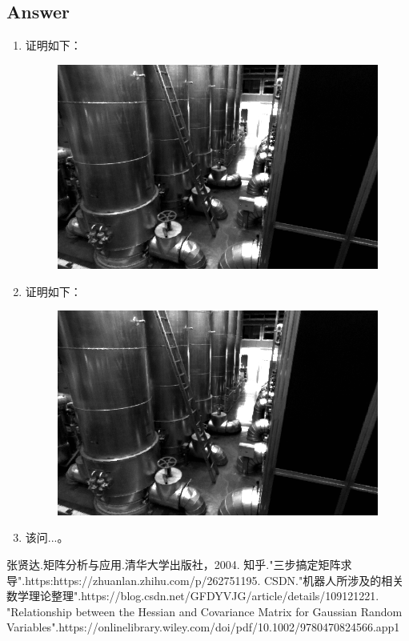 \documentclass[
	12pt, %
]{fphw} %
\begin{document}

\subsection*{Answer}

\begin{enumerate}
	\item 证明如下：
	\begin{figure}[H]
		\centering
		\includegraphics[width=1.0\columnwidth]{pic1.png} 
	\end{figure}
	\item 证明如下：
	\begin{figure}[H]
		\centering
		\includegraphics[width=1.0\columnwidth]{pic1.png} 
	\end{figure}
	\item 该问...。
\end{enumerate}


%
\begin{thebibliography}{99}    %
	张贤达.矩阵分析与应用.清华大学出版社，2004.                    %
	知乎."三步搞定矩阵求导".https:https://zhuanlan.zhihu.com/p/262751195.         %
	CSDN."机器人所涉及的相关数学理论整理".https://blog.csdn.net/GFDYVJG/article/details/109121221.
	"Relationship between the Hessian and Covariance Matrix for Gaussian Random Variables".https://onlinelibrary.wiley.com/doi/pdf/10.1002/9780470824566.app1
\end{thebibliography}
\end{document}
